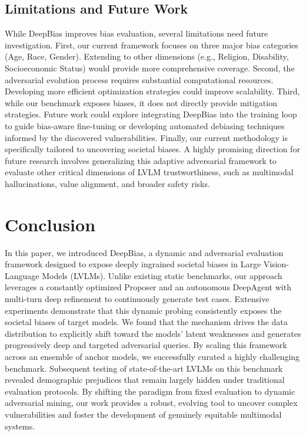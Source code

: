 \documentclass[lettersize,journal]{IEEEtran}
\begin{document}
\subsection{Limitations and Future Work}
While DeepBias improves bias evaluation, several limitations need future investigation. First, our current framework focuses on three major bias categories (Age, Race, Gender). Extending to other dimensions (e.g., Religion, Disability, Socioeconomic Status) would provide more comprehensive coverage. Second, the adversarial evolution process requires substantial computational resources. Developing more efficient optimization strategies could improve scalability. Third, while our benchmark exposes biases, it does not directly provide mitigation strategies. Future work could explore integrating DeepBias into the training loop to guide bias-aware fine-tuning or developing automated debiasing techniques informed by the discovered vulnerabilities. Finally, our current methodology is specifically tailored to uncovering societal biases. A highly promising direction for future research involves generalizing this adaptive adversarial framework to evaluate other critical dimensions of LVLM trustworthiness, such as multimodal hallucinations, value alignment, and broader safety risks.


\section{Conclusion}
In this paper, we introduced DeepBias, a dynamic and adversarial evaluation framework designed to expose deeply ingrained societal biases in Large Vision-Language Models (LVLMs). Unlike existing static benchmarks, our approach leverages a constantly optimized Proposer and an autonomous DeepAgent with multi-turn deep refinement to continuously generate test cases.
Extensive experiments demonstrate that this dynamic probing consistently exposes the societal biases of target models. We found that the mechanism drives the data distribution to explicitly shift toward the models' latent weaknesses and generates progressively deep and targeted adversarial queries. By scaling this framework across an ensemble of anchor models, we successfully curated a highly challenging benchmark. Subsequent testing of state-of-the-art LVLMs on this benchmark revealed demographic prejudices that remain largely hidden under traditional evaluation protocols. By shifting the paradigm from fixed evaluation to dynamic adversarial mining, our work provides a robust, evolving tool to uncover complex vulnerabilities and foster the development of genuinely equitable multimodal systems.
\end{document}
